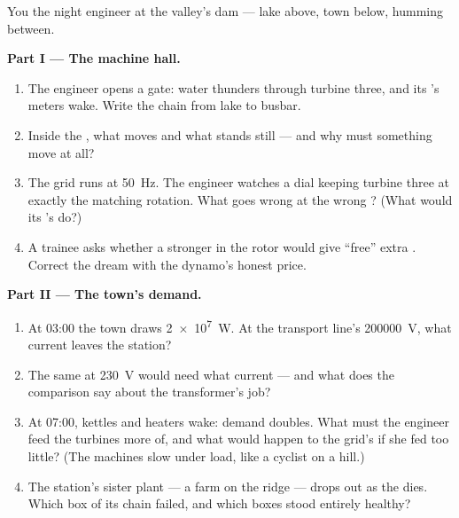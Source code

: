 \begin{problem}\label{pb:g9:alternator:1}
You  the night engineer at the valley's dam --- lake
above, town below,  humming between.

\medskip\noindent\textbf{Part I --- The machine hall.}
\begin{enumerate}
  \item The engineer opens a gate: water thunders through
        turbine three, and its 's meters wake.
        Write the  chain from lake to busbar.
  \item Inside the , what moves and what stands
        still --- and why must something move at all?
  \item The grid runs at \qty{50}{Hz}. The engineer
        watches a dial keeping turbine three at exactly
        the matching rotation. What goes wrong at the
        wrong ? (What would its 's 
        do?)
  \item A trainee asks whether a stronger  in the
        rotor would give ``free'' extra . Correct the
        dream with the dynamo's honest price.
\end{enumerate}

\medskip\noindent\textbf{Part II --- The town's demand.}
\begin{enumerate}[resume]
  \item At 03:00 the town draws \qty{2e7}{W}. At
        the transport line's \qty{200000}{V}, what current
        leaves the station?
  \item The same  at \qty{230}{V} would need what
        current --- and what does the comparison say about
        the transformer's job?
  \item At 07:00, kettles and heaters wake:
        demand doubles. What must the engineer feed the
        turbines more of, and what would happen to the
        grid's  if she fed too little? (The
        machines slow under load, like a cyclist on a
        hill.)
  \item The station's sister plant --- a  farm on the
        ridge --- drops out as the  dies. Which box of
        its chain failed, and which boxes stood entirely
        healthy?
\end{enumerate}


\end{problem}
